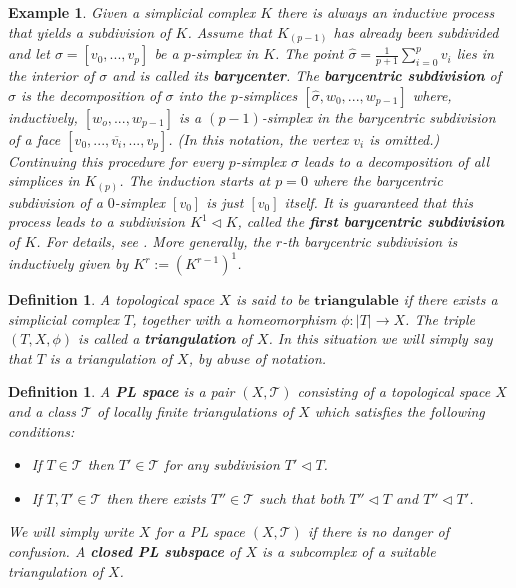 \documentclass{scrreprt}
\newtheorem{definition}[prop]{Definition}
\newtheorem{example}[prop]{Example}
\begin{document}
\begin{example}
Given a simplicial complex $K$ there is always an inductive process that yields a subdivision of $K$. Assume that $K_{(p-1)}$ has already been subdivided and let $\sigma=[v_0,...,v_p]$ be a $p$-simplex in $K$. The point $\hat{\sigma}=\frac{1}{p+1} \sum_{i=0}^p v_i$ lies in the interior of $\sigma$ and is called its \textbf{barycenter}. The \textbf{barycentric subdivision} of $\sigma$ is the decomposition of $\sigma$ into the $p$-simplices $[\hat{\sigma},w_0,...,w_{p-1}]$ where, inductively, $[w_o,...,w_{p-1}]$ is a $(p-1)$-simplex in the barycentric subdivision of a face $[v_0,...,\overline{v_i},...,v_p]$. (In this notation, the vertex $v_i$ is omitted.) Continuing this procedure for every $p$-simplex $\sigma$ leads to a decomposition of all simplices in $K_{(p)}$. The induction starts at $p=0$ where the barycentric subdivision of a $0$-simplex $[v_0]$ is just $[v_0]$ itself. It is guaranteed that this process leads to a subdivision $K^1 \lhd K$, called the \textbf{first barycentric subdivision} of $K$. For details, see \cite{hatcher}. More generally, the $r$-th barycentric subdivision is inductively given by $K^r:=(K^{r-1})^1$.
\end{example}


\begin{definition}
A topological space $X$ is said to be $\mathbf{triangulable}$ if there exists a simplicial complex $T$, together with a homeomorphism $\phi : |T| \to X$. The triple $(T,X, \phi)$ is called a \textbf{triangulation} of $X$. In this situation we will simply say that $T$ is a triangulation of $X$, by abuse of notation.
\end{definition}


\begin{definition}
A \textbf{PL space} is a pair $(X,\mathcal{T})$ consisting of a topological space $X$ and a class $\mathcal{T}$ of locally finite triangulations of $X$ which satisfies the following conditions:
\begin{itemize}
\item If $T \in \mathcal{T}$ then $T' \in \mathcal{T}$ for any subdivision $T' \lhd T$.
\item If $T,T' \in \mathcal{T}$ then there exists $T'' \in \mathcal{T}$ such that both $T'' \lhd T$ and $T'' \lhd T'$.
\end{itemize}
We will simply write $X$ for a PL space $(X,\mathcal{T})$ if there is no danger of confusion. A \textbf{closed PL subspace} of $X$ is a subcomplex of a suitable triangulation of $X$.
\end{definition}
\end{document}
